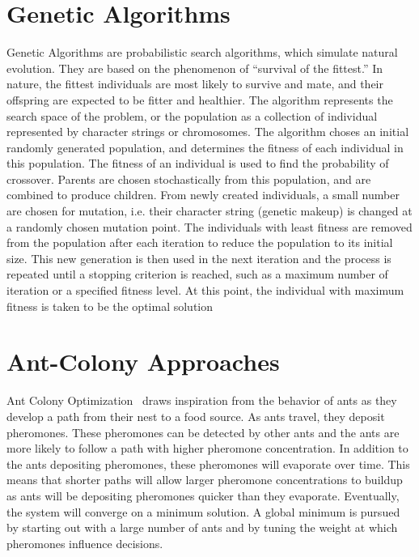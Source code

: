 \documentclass[10pt,twocolumn,notitlepage]{article}
\begin{document}
\section{Genetic Algorithms}
Genetic Algorithms are probabilistic search algorithms, which simulate natural evolution.  They are based on the phenomenon of ``survival of the fittest.''  In nature, the fittest individuals are most likely to survive and mate, and their offspring are expected to be fitter and healthier.  The algorithm represents the search space of the problem, or the population as a collection of individual represented by character strings or chromosomes.  The algorithm choses an initial randomly generated population, and determines the fitness of each individual in this population.  The fitness of an individual is used to find the probability of crossover.  Parents are chosen stochastically from this population, and are combined to produce children.  From newly created individuals, a small number are chosen for mutation, i.e. their character string (genetic makeup) is changed at a randomly chosen mutation point.  The individuals with least fitness are removed from the population after each iteration to reduce the population to its initial size.  This new generation is then used in the next iteration and the process is repeated until a stopping criterion is reached, such as a maximum number of iteration or a specified fitness level.  At this point, the individual with maximum fitness is taken to be the optimal solution

\section{Ant-Colony Approaches}
Ant Colony Optimization~\cite{Dorigo96theant} draws inspiration from the behavior of ants as they develop a path from their nest to a food source.  As ants travel, they deposit pheromones.  These pheromones can be detected by other ants and the ants are more likely to follow a path with higher pheromone concentration.  In addition to the ants depositing pheromones, these pheromones will evaporate over time.  This means that shorter paths will allow larger pheromone concentrations to buildup as ants will be depositing pheromones quicker than they evaporate.  Eventually, the system will converge on a minimum solution.  A global minimum is pursued by starting out with a large number of ants and by tuning the weight at which pheromones influence decisions. 
\end{document}
